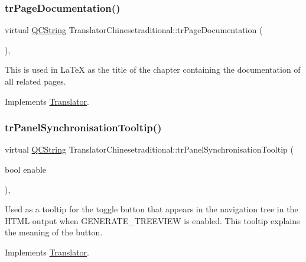 \subsubsection{\texorpdfstring{trPageDocumentation()}{trPageDocumentation()}}
{\footnotesize\ttfamily virtual \mbox{\hyperlink{class_q_c_string}{Q\+C\+String}} Translator\+Chinesetraditional\+::tr\+Page\+Documentation (\begin{DoxyParamCaption}{ }\end{DoxyParamCaption})\hspace{0.3cm}{\ttfamily [inline]}, {\ttfamily [virtual]}}

This is used in La\+TeX as the title of the chapter containing the documentation of all related pages. 

Implements \mbox{\hyperlink{class_translator}{Translator}}.

\mbox{\label{class_translator_chinesetraditional_ad842d937ba05293dcd9f47b0bff544f4}} 
\subsubsection{\texorpdfstring{trPanelSynchronisationTooltip()}{trPanelSynchronisationTooltip()}}
{\footnotesize\ttfamily virtual \mbox{\hyperlink{class_q_c_string}{Q\+C\+String}} Translator\+Chinesetraditional\+::tr\+Panel\+Synchronisation\+Tooltip (\begin{DoxyParamCaption}\item[{bool}]{enable }\end{DoxyParamCaption})\hspace{0.3cm}{\ttfamily [inline]}, {\ttfamily [virtual]}}

Used as a tooltip for the toggle button that appears in the navigation tree in the H\+T\+ML output when G\+E\+N\+E\+R\+A\+T\+E\+\_\+\+T\+R\+E\+E\+V\+I\+EW is enabled. This tooltip explains the meaning of the button. 

Implements \mbox{\hyperlink{class_translator}{Translator}}.

\mbox{\label{class_translator_chinesetraditional_a0470e477f7a67716fe4c4f7f232ba1d2}} 

